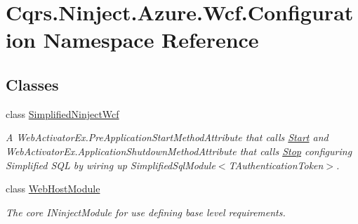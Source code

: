 \hypertarget{namespaceCqrs_1_1Ninject_1_1Azure_1_1Wcf_1_1Configuration}{}\section{Cqrs.\+Ninject.\+Azure.\+Wcf.\+Configuration Namespace Reference}
\label{namespaceCqrs_1_1Ninject_1_1Azure_1_1Wcf_1_1Configuration}
\subsection*{Classes}
\begin{DoxyCompactItemize}
\item 
class \hyperlink{classCqrs_1_1Ninject_1_1Azure_1_1Wcf_1_1Configuration_1_1SimplifiedNinjectWcf}{Simplified\+Ninject\+Wcf}
\begin{DoxyCompactList}\small\item\em A Web\+Activator\+Ex.\+Pre\+Application\+Start\+Method\+Attribute that calls \hyperlink{classCqrs_1_1Ninject_1_1Azure_1_1Wcf_1_1Configuration_1_1SimplifiedNinjectWcf_a4686133f581e5e5d890ec78faa26584e_a4686133f581e5e5d890ec78faa26584e}{Start} and Web\+Activator\+Ex.\+Application\+Shutdown\+Method\+Attribute that calls \hyperlink{classCqrs_1_1Ninject_1_1Azure_1_1Wcf_1_1Configuration_1_1SimplifiedNinjectWcf_a7a4bdce5525a0b3ae46efacedb74bbda_a7a4bdce5525a0b3ae46efacedb74bbda}{Stop} configuring Simplified S\+QL by wiring up Simplified\+Sql\+Module$<$\+T\+Authentication\+Token$>$. \end{DoxyCompactList}\item 
class \hyperlink{classCqrs_1_1Ninject_1_1Azure_1_1Wcf_1_1Configuration_1_1WebHostModule}{Web\+Host\+Module}
\begin{DoxyCompactList}\small\item\em The core I\+Ninject\+Module for use defining base level requirements. \end{DoxyCompactList}\end{DoxyCompactItemize}
